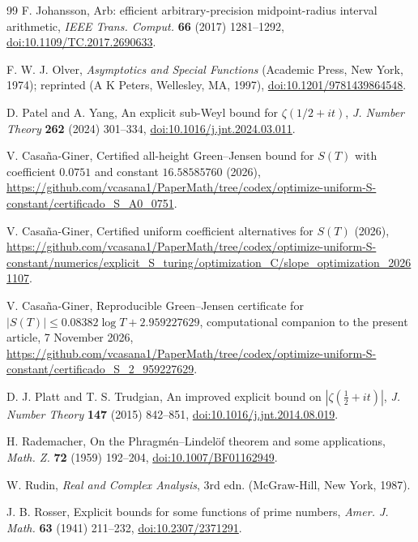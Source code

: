 \documentclass[11pt,reqno]{amsart}
\numberwithin{equation}{section}
\theoremstyle{definition}
\theoremstyle{remark}
\begin{document}
\begin{thebibliography}{99}
 F. Johansson, Arb: efficient arbitrary-precision midpoint-radius interval arithmetic, \textit{IEEE Trans. Comput.} \textbf{66} (2017) 1281--1292, \href{https://doi.org/10.1109/TC.2017.2690633}{doi:10.1109/TC.2017.2690633}.

 F. W. J. Olver, \textit{Asymptotics and Special Functions} (Academic Press, New York, 1974); reprinted (A K Peters, Wellesley, MA, 1997), \href{https://doi.org/10.1201/9781439864548}{doi:10.1201/9781439864548}.

 D. Patel and A. Yang, An explicit sub-Weyl bound for $\zeta(1/2+it)$, \textit{J. Number Theory} \textbf{262} (2024) 301--334, \href{https://doi.org/10.1016/j.jnt.2024.03.011}{doi:10.1016/j.jnt.2024.03.011}.

 V. Casa\~na-Giner, Certified all-height Green--Jensen bound for $S(T)$ with coefficient $0.0751$ and constant $16.58585760$ (2026), \url{https://github.com/vcasana1/PaperMath/tree/codex/optimize-uniform-S-constant/certificado_S_A0_0751}.

 V. Casa\~na-Giner, Certified uniform coefficient alternatives for $S(T)$ (2026), \url{https://github.com/vcasana1/PaperMath/tree/codex/optimize-uniform-S-constant/numerics/explicit_S_turing/optimization_C/slope_optimization_20261107}.

 V. Casa\~na-Giner, Reproducible Green--Jensen certificate for $|S(T)|\le0.08382\log T+2.959227629$, computational companion to the present article, 7 November 2026, \url{https://github.com/vcasana1/PaperMath/tree/codex/optimize-uniform-S-constant/certificado_S_2_959227629}.

 D. J. Platt and T. S. Trudgian, An improved explicit bound on $|\zeta(\frac12+it)|$, \textit{J. Number Theory} \textbf{147} (2015) 842--851, \href{https://doi.org/10.1016/j.jnt.2014.08.019}{doi:10.1016/j.jnt.2014.08.019}.

 H. Rademacher, On the Phragm\'en--Lindel\"of theorem and some applications, \textit{Math. Z.} \textbf{72} (1959) 192--204, \href{https://doi.org/10.1007/BF01162949}{doi:10.1007/BF01162949}.

 W. Rudin, \textit{Real and Complex Analysis}, 3rd edn. (McGraw-Hill, New York, 1987).

 J. B. Rosser, Explicit bounds for some functions of prime numbers, \textit{Amer. J. Math.} \textbf{63} (1941) 211--232, \href{https://doi.org/10.2307/2371291}{doi:10.2307/2371291}.


\end{thebibliography}
\end{document}
